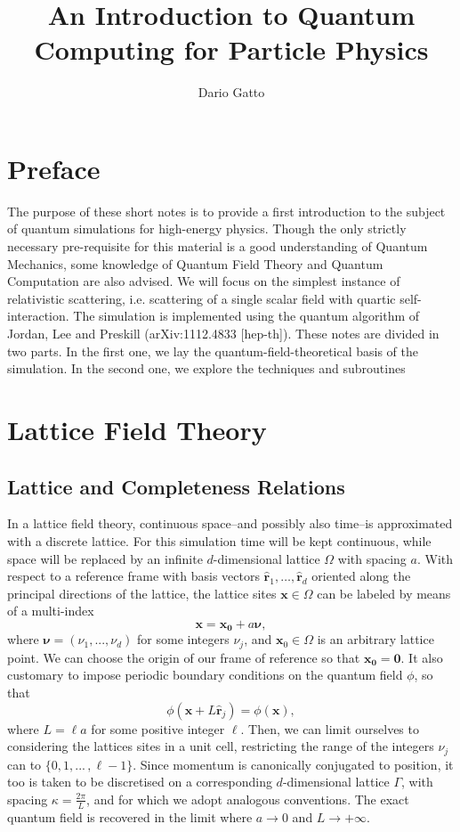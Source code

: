 \documentclass[a4paper,10pt]{report}
\author{Dario Gatto}
\title{An Introduction to Quantum Computing for Particle Physics}
\begin{document}
\maketitle
\chapter*{Preface}
The purpose of these short notes is to provide a first introduction to the subject of quantum simulations for high-energy physics. Though the only strictly necessary pre-requisite for this material is a good understanding of Quantum Mechanics, some knowledge of Quantum Field Theory and Quantum Computation are also advised. We will focus on the simplest instance of relativistic scattering, i.e. scattering of a single scalar field with quartic self-interaction. The simulation is implemented using the quantum algorithm of Jordan, Lee and Preskill (arXiv:1112.4833 [hep-th]). These notes are divided in two parts. In the first one, we lay the quantum-field-theoretical basis of the simulation. In the second one, we explore the techniques and subroutines  

\chapter{Lattice Field Theory}
\section{Lattice and Completeness Relations}
In a lattice field theory, continuous space--and possibly also time--is approximated with a discrete lattice. For this simulation time will be kept continuous, while space will be replaced by an infinite $d$-dimensional lattice $\Omega$ with spacing $a$. With respect to a reference frame with basis vectors $\hat{\mathbf{r}}_1,\dots,\hat{\mathbf{r}}_d$ oriented along the principal directions of the lattice, the lattice sites $\mathbf{x}\in\Omega$ can be labeled by means of a multi-index
\begin{equation}
\mathbf{x} = \mathbf{x_0} + a\boldsymbol{\nu},
\end{equation}
where $\boldsymbol{\nu}=(\nu_1,...,\nu_d)$ for some integers $\nu_j$, and $\mathbf{x}_0\in\Omega$ is an arbitrary lattice point. We can choose the origin of our frame of reference so that $\mathbf{x_0}=\mathbf{0}$. It also customary to impose periodic boundary conditions on the quantum field $\phi$, so that
\begin{equation}
\phi(\mathbf{x} + L\hat{\mathbf{r}}_j) = \phi(\mathbf{x}),
\end{equation} 
where $L=\ell a$ for some positive integer $\ell$. Then, we can limit ourselves to considering the lattices sites in a unit cell, restricting the range of the integers $\nu_j$ can to $\{0,1,...\,,\ell-1\}$. Since momentum is canonically conjugated to position, it too is taken to be discretised on a corresponding $d$-dimensional lattice $\Gamma$, with spacing $\kappa=\frac{2\pi}{L}$, and for which we adopt analogous conventions. The exact quantum field is recovered in the limit where $a\longrightarrow0$ and $L\longrightarrow+\infty$.
\end{document}
